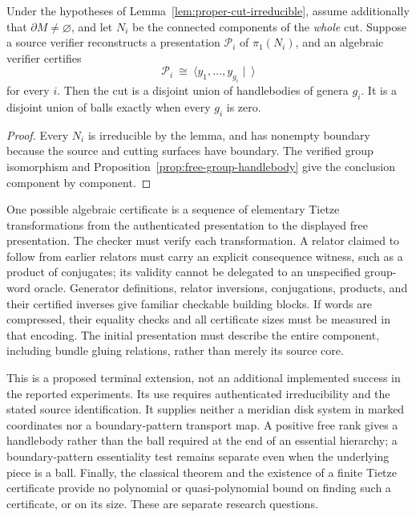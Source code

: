 \begin{corollary}
\label{cor:terminal-tietze}
Under the hypotheses of Lemma~\ref{lem:proper-cut-irreducible}, assume
additionally that $\partial M\ne\varnothing$, and let $N_i$ be the
connected components of the \emph{whole} cut.  Suppose a source
verifier reconstructs a presentation $\mathcal P_i$ of $\pi_1(N_i)$, and
an algebraic verifier certifies
\[
 \mathcal P_i\ \cong\ \langle y_1,\ldots,y_{g_i}\mid\ \rangle
\]
for every $i$.  Then the cut is a disjoint union of handlebodies of genera
$g_i$.  It is a disjoint union of balls exactly when every $g_i$ is zero.
\end{corollary}
\begin{proof}
Every $N_i$ is irreducible by the lemma, and has nonempty boundary because
the source and cutting surfaces have boundary.  The verified group
isomorphism and Proposition~\ref{prop:free-group-handlebody} give the
conclusion component by component.
\end{proof}

One possible algebraic certificate is a sequence of elementary Tietze
transformations from the authenticated presentation to the displayed
free presentation.  The checker must verify each transformation.  A
relator claimed to follow from earlier relators must carry an explicit
consequence witness, such as a product of conjugates; its validity cannot
be delegated to an unspecified group-word oracle.  Generator definitions,
relator inversions, conjugations, products, and their certified inverses
give familiar checkable building blocks.  If words are compressed, their
equality checks and all certificate sizes must be measured in that
encoding.  The initial presentation must describe the entire component,
including bundle gluing relations, rather than merely its source core.

This is a proposed terminal extension, not an additional implemented
success in the reported experiments.  Its use requires authenticated
irreducibility and the stated source identification.  It supplies neither
a meridian disk system in marked coordinates nor a boundary-pattern
transport map.  A positive free rank gives a handlebody rather than the
ball required at the end of an essential hierarchy; a boundary-pattern
essentiality test remains separate even when the underlying piece is a
ball.  Finally, the classical theorem and the existence of a finite
Tietze certificate provide no polynomial or quasi-polynomial bound on
finding such a certificate, or on its size.  These are separate research
questions.

